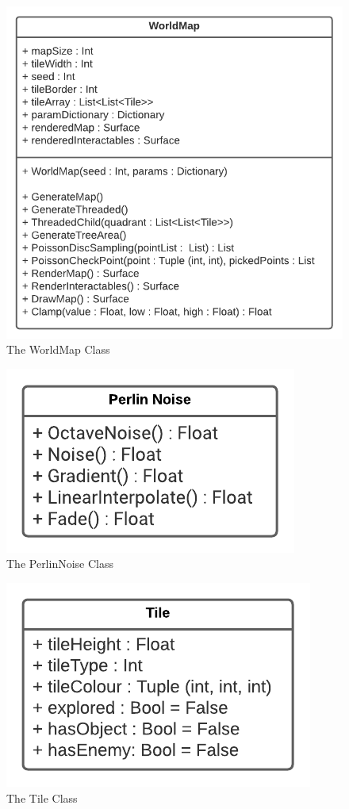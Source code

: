 \begin{flushleft}
                \begin{figure}[H]
                    \centering
                    \includegraphics[width=.65\textwidth]{Images/Design/Classes/WorldMap.png}
                    \caption*{The WorldMap Class}
                \end{figure}
                \begin{figure}[H]
                    \centering
                    \includegraphics[width=.45\textwidth]{Images/Design/Classes/PerlinNoise.png}
                    \caption*{The PerlinNoise Class}
                \end{figure}
                \begin{figure}[H]
                    \centering
                    \includegraphics[width=.35\textwidth]{Images/Design/Classes/Tile.png}
                    \caption*{The Tile Class}
                \end{figure}
                \begin{figure}[H]
                    \centering

\end{figure}
\end{flushleft}
